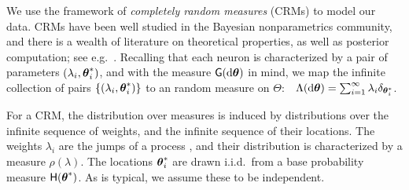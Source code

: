 % 
% 
We use the framework of \emph{completely random measures} (CRMs) \citep{Kingman:PJM67} to model our data.
CRMs have been well studied in the Bayesian nonparametrics community, and there is a wealth of literature on
theoretical properties, as well as posterior computation; see e.g.\ \citep{JamesLP09, Hjo1990, ThiJor2007}. 
Recalling that each neuron is characterized by a pair of parameters $(\lambda_i, \boldsymbol{\theta}^*_i)$, and with the measure $\mathsf{G}(\mathrm{d} \boldsymbol{\theta})$ in mind,
we map the infinite collection of pairs $\{(\lambda_i, \boldsymbol{\theta}^*_i)\}$ to an random measure on $\Theta$:
$\ \  \Lambda(\mathrm{d} \boldsymbol{\theta}) = \sum_{i=1}^{\infty} \lambda_i \delta_{\boldsymbol{\theta}^*_i}$.

For a CRM, the distribution over measures is induced by distributions
over the infinite sequence of weights, and the infinite sequence of their locations. 
The weights $\lambda_i$ are the jumps of a \Levy process \citep{Sato90}, and their distribution is characterized by a 
\Levy measure $\rho(\lambda)$. The locations $\boldsymbol{\theta}^*_i$ are drawn i.i.d.\  from a base probability measure $\mathsf{H}(\boldsymbol{\theta}^*)$.
As is typical, we assume these to be independent. %

